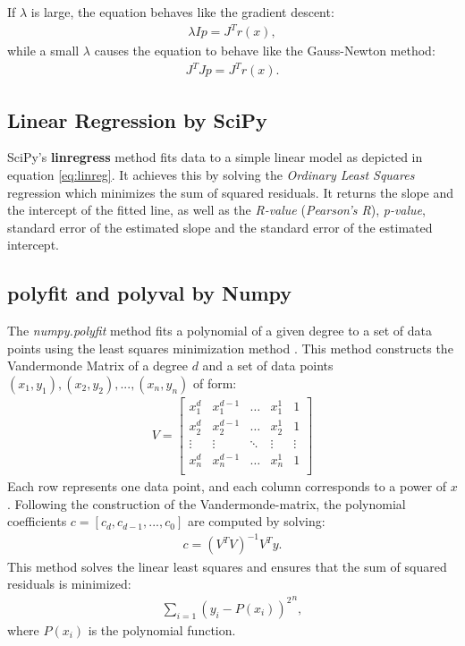 If $\lambda$ is large, the equation behaves like the gradient descent:
\begin{align}
    \lambda I p= J^{T}r(x),
\end{align}
while a small $\lambda$ causes the equation to behave like the Gauss-Newton method:
\begin{align}
    J^{T}Jp=J^{T}r(x).
\end{align}
\cite{gavin2020levenberg} \cite{Levenberg-Marquardt} \cite{broxOptimierung}

\subsection{Linear Regression by SciPy}\label{subsec:linreg}
SciPy's \textbf{linregress} method fits data to a simple linear model as depicted in equation \ref{eq:linreg}. It achieves this by solving the \textit{Ordinary Least Squares} regression which minimizes the sum of squared residuals. It returns the slope and the intercept of the fitted line, as well as the \textit{R-value} (\textit{Pearson's R}), \textit{p-value}, standard error  of the estimated slope and the standard error of the estimated intercept.
\cite{SciPyLinRegress} \cite{Wooditch2021}

\subsection{polyfit and polyval by Numpy}\label{subsec:polyfit}
The \textit{numpy.polyfit} method fits a polynomial of a given degree to a set of data points using the least squares minimization method \cite{NumPyPolyfit}. This method constructs the Vandermonde Matrix of a degree $d$ and a set of data points $(x_{1}, y_{1}), (x_{2}, y_{2}), ...,(x_{n}, y_{n})$ of form:
\begin{align}
    V =
    \begin{bmatrix} 
        x_{1}^{d} & x_{1}^{d-1} & \dots & x_{1}^{1} & 1 \\
        x_{2}^{d} & x_{2}^{d-1} & \dots & x_{2}^{1} & 1 \\
        \vdots & \vdots & \ddots & \vdots & \vdots \\
        x_{n}^{d} & x_{n}^{d-1} & \dots & x_{n}^{1} & 1 \\ 
    \end{bmatrix}
\end{align}
Each row represents one data point, and each column corresponds to a power of $x$. Following the construction of the Vandermonde-matrix, the polynomial coefficients $c=[c_{d},c_{d-1},...,c_{0}]$ are computed by solving:
\begin{align}
    c=(V^{T}V)^{-1}V^{T}y.
\end{align}
This method solves the linear least squares and ensures that the sum of squared residuals is minimized:
\begin{align}
    \sum_{i=1}{(y_{i}-P(x_i))^{2}}^{n},
\end{align}
where $P(x_i)$ is the polynomial function. \cite{NumPyPolyfit} \cite{Vandermonde} \cite{GATechLS}

